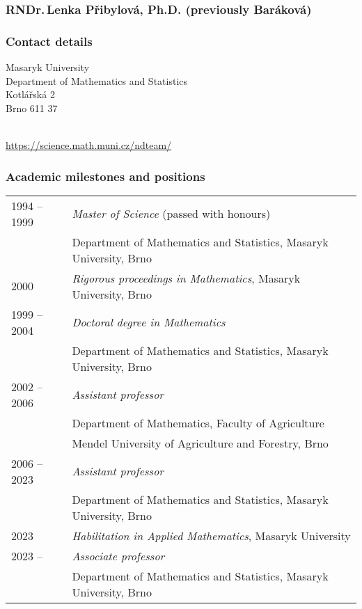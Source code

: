 \subsubsection*{RNDr.\,Lenka Přibylová, Ph.D. (previously Baráková)}
\label{cv:lpribylova}

\subsubsection*{Contact details}

Masaryk University\\
Department of Mathematics and Statistics\\
Kotlářská 2\\
Brno 611 37

\\
\url{https://science.math.muni.cz/ndteam/}\\

\subsubsection*{Academic milestones and positions}

\enlargethispage{1cm}
\begin{tabularx}{\linewidth}{ll}
    1994 -- 1999 & \emph{Master of Science} {\small (passed with honours)} \\
    & Department of Mathematics and Statistics, Masaryk University, Brno \\
    2000 & \emph{Rigorous proceedings in Mathematics}, Masaryk University, Brno \\
    1999 -- 2004 & \emph{Doctoral degree in Mathematics} \\
    & Department of Mathematics and Statistics, Masaryk University, Brno \\
    2002 -- 2006 & \emph{Assistant professor} \\
    & Department of Mathematics, Faculty of Agriculture\\
    & Mendel University of Agriculture and Forestry, Brno \\
    2006 -- 2023 & \emph{Assistant professor} \\
    & Department of Mathematics and Statistics, Masaryk University, Brno \\
    2023 & \emph{Habilitation in Applied Mathematics}, Masaryk University \\
    2023 -- & \emph{Associate professor} \\
    & Department of Mathematics and Statistics, Masaryk University, Brno \\
\end{tabularx}

